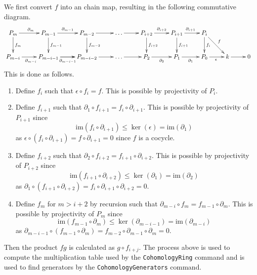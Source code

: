\documentclass[12pt]{article}
\begin{document}
We first convert $f$ into an chain map,
resulting in the following commutative diagram.
\begin{equation}\label{ff}\xymatrix{
P_m\ar[r]^{\partial_m}\ar[d]^{f_m}
&P_{m-1}\ar[d]^{f_{m-1}}\ar[r]^{\partial_{m-1}}
&P_{m-2}\ar[d]^{f_{m-2}}\ar[r]
&\dots\ar[r]
&P_{i+2}\ar[r]^{\partial_{i+2}}\ar[d]^{f_{i+2}}
&P_{i+1}\ar[r]^{\partial_{i+1}}\ar[d]^{f_{i+1}}
&P_i\ar[d]^{f_i}\ar[dr]^f
\\
P_{m-i}\ar[r]_{\partial_{m-i}}
&P_{m-i-1}\ar[r]\ar[r]_{\partial_{m-i-1}}
&P_{m-i-2}\ar[r]
&\dots\ar[r]
&P_2\ar[r]_{\partial_2}
&P_1\ar[r]_{\partial_1}
&P_0\ar[r]_\epsilon&k\ar[r]&0
}\end{equation}
This is done as follows.
\begin{enumerate}
\item Define $f_i$ such that $\epsilon\circ f_i=f$.
This is possible by projectivity of $P_i$.
\item Define $f_{i+1}$ such that $\partial_1\circ f_{i+1}
=f_i\circ\partial_{i+1}$.
This is possible by projectivity of $P_{i+1}$ since
\[\mathrm{im}\left(f_i\circ\partial_{i+1}\right)
\le\ker\left(\epsilon\right)
=\mathrm{im}\left(\partial_1\right)\]
as $\epsilon\circ\left(f_i\circ\partial_{i+1}\right)
=f\circ\partial_{i+1}=0$ since $f$ is a cocycle.
\item Define $f_{i+2}$ such that $\partial_2\circ f_{i+2}
=f_{i+1}\circ\partial_{i+2}$.
This is possible by projectivity of $P_{i+2}$ since
\[\mathrm{im}\left(f_{i+1}\circ\partial_{i+2}\right)
\le\ker\left(\partial_1\right)
=\mathrm{im}\left(\partial_2\right)\]
as $\partial_1\circ\left(f_{i+1}\circ\partial_{i+2}\right)
=f_i\circ\partial_{i+1}\circ\partial_{i+2}=0$.
\item Define $f_m$ for $m>i+2$ by recursion 
such that $\partial_{m-i}\circ f_m
=f_{m-1}\circ\partial_m$.
This is possible by projectivity of $P_m$ since
\[\mathrm{im}\left(f_{m-1}\circ\partial_m\right)
\le\ker\left(\partial_{m-i-1}\right)
=\mathrm{im}\left(\partial_{m-i}\right)\]
as $\partial_{m-i-1}\circ\left(f_{m-1}\circ\partial_m\right)
=f_{m-2}\circ\partial_{m-1}\circ\partial_m=0$.
\end{enumerate}
Then the product $fg$ is calculated as $g\circ f_{i+j}$.
The process above is used to compute the multiplication
table used by the \verb!CohomologyRing! command
and is used to find generators by the \verb!CohomologyGenerators!
command.
\end{document}
